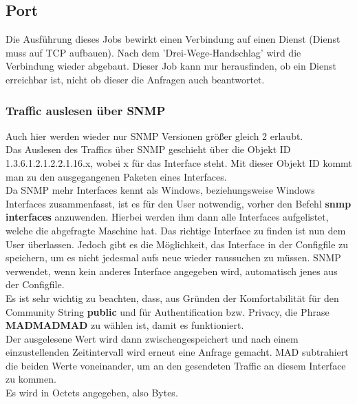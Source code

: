 \documentclass[12pt,a4paper]{report}
\begin{document}
\begin{onehalfspace}
\subsection{Port} Die Ausführung dieses Jobs bewirkt einen Verbindung auf einen Dienst (Dienst muss auf TCP aufbauen). Nach dem 'Drei-Wege-Handschlag' wird die Verbindung wieder abgebaut. Dieser Job kann nur herausfinden, ob ein Dienst erreichbar ist, nicht ob dieser die Anfragen auch beantwortet.

\newpage
{}%

\subsubsection{Traffic auslesen über SNMP}
Auch hier werden wieder nur SNMP Versionen größer gleich 2 erlaubt.\\
Das Auslesen des Traffics über SNMP geschieht über die Objekt ID 1.3.6.1.2.1.2.2.1.16.x, wobei x für das Interface steht. Mit dieser Objekt ID kommt man zu den ausgegangenen Paketen eines Interfaces.\\
Da SNMP mehr Interfaces kennt als Windows, beziehungsweise Windows Interfaces zusammenfasst, ist es für den User notwendig, vorher den Befehl \textbf{snmp interfaces} anzuwenden. Hierbei werden ihm dann alle Interfaces aufgelistet, welche die abgefragte Maschine hat. Das richtige Interface zu finden ist nun dem User überlassen. Jedoch gibt es die Möglichkeit, das Interface in der Configfile zu speichern, um es nicht jedesmal aufs neue wieder raussuchen zu müssen. SNMP verwendet, wenn kein anderes Interface angegeben wird, automatisch jenes aus der Configfile.\\
Es ist sehr wichtig zu beachten, dass, aus Gründen der Komfortabilität für den Community String \textbf{public} und für Authentification bzw. Privacy, die Phrase \textbf{MADMADMAD} zu wählen ist, damit es funktioniert.\\

Der ausgelesene Wert wird dann zwischengespeichert und nach einem einzustellenden Zeitintervall wird erneut eine Anfrage gemacht. MAD subtrahiert die beiden Werte voneinander, um an den gesendeten Traffic an diesem Interface zu kommen.\\
Es wird in Octets angegeben, also Bytes.


\end{onehalfspace}
\end{document}
